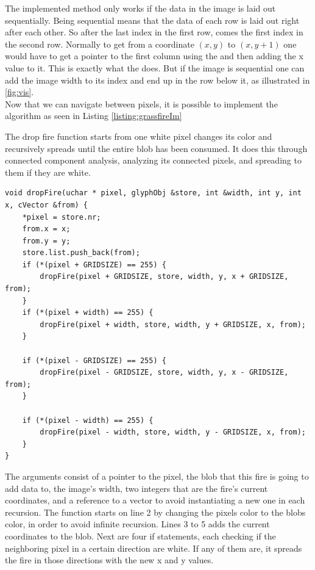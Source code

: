  The implemented method only works if the data in the image is laid out sequentially. Being sequential means that the data of each row is laid out right after each other. So after the last index in the first row, comes the first index in the second row. Normally to get from a coordinate $(x,y)$ to $(x,y+1)$ one would have to get a pointer to the first column using the  and then adding the x value to it. This is exactly what the  does. But if the image is sequential one can add the image width to its index and end up in the row below it, as illustrated in \autoref{fig:vis}.\\
 
 Now that we can navigate between pixels, it is possible to implement the algorithm as seen in Listing \ref{listing:grassfireIm}
\begin{listing}[H]
	\caption{The drop fire function starts from one white pixel changes its color and recursively spreads until the entire blob has been consumed. It does this through connected component analysis, analyzing its connected pixels, and spreading to them if they are white.}
	\begin{verbatim}
void dropFire(uchar * pixel, glyphObj &store, int &width, int y, int x, cVector &from) {
	*pixel = store.nr;
	from.x = x;
	from.y = y;
	store.list.push_back(from);
	if (*(pixel + GRIDSIZE) == 255) {
		dropFire(pixel + GRIDSIZE, store, width, y, x + GRIDSIZE, from);
	}
	if (*(pixel + width) == 255) {
		dropFire(pixel + width, store, width, y + GRIDSIZE, x, from);
	}
	
	if (*(pixel - GRIDSIZE) == 255) {
		dropFire(pixel - GRIDSIZE, store, width, y, x - GRIDSIZE, from);
	}
	
	if (*(pixel - width) == 255) {
		dropFire(pixel - width, store, width, y - GRIDSIZE, x, from);
	}
}
	\end{verbatim}
	\label{listing:grassfireIm}
\end{listing} 
The arguments consist of a pointer to the pixel, the blob that this fire is going to add data to, the image's width, two integers that are the fire's current coordinates, and a reference to a vector to avoid instantiating a new one in each recursion. The function starts on line 2 by changing the pixels color to the blobs color, in order to avoid infinite recursion. Lines 3 to 5 adds the current coordinates to the blob. Next are four if statements, each checking if the neighboring pixel in a certain direction are white. If any of them are, it spreads the fire in those directions with the new x and y values.\\

